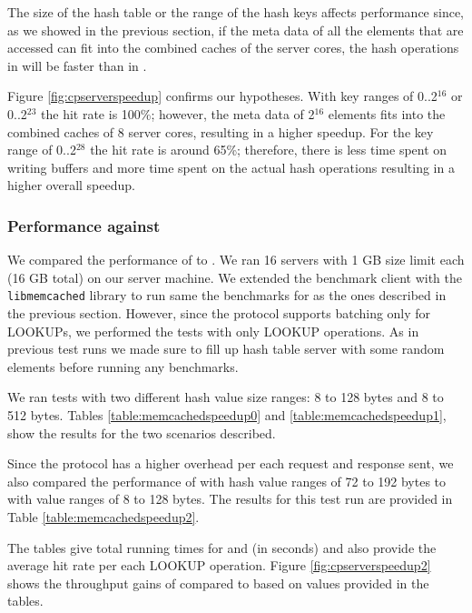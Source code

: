 The size of the hash table or the range of the hash keys affects performance since, as we showed in the previous section, if the meta data of all the elements 
that are accessed can fit into the combined caches of the server cores, the hash operations in \cphash{} will be faster than in \lockhash{}.

Figure \ref{fig:cpserverspeedup} confirms our hypotheses. With key ranges of 0..2$^{16}$ or 0..2$^{23}$ the hit rate is 100\%; however, the meta data of 
2$^{16}$ elements fits into the combined caches of 8 server cores, resulting in a higher speedup. For the key range of 0..2$^{28}$ the hit rate is around 65\%; 
therefore, there is less time spent on writing buffers and more time spent on the actual hash operations resulting in a higher overall speedup.

\subsubsection{Performance against \memcached{}}
We compared the performance of \cpserver{} to \memcached{}. We ran 16 \memcached{} servers with 1 GB size limit each (16 GB total) on our server machine.
We extended the benchmark client with the \texttt{libmemcached} library \cite{libmemcached} to run same the benchmarks for \memcached{} as the ones described in
the previous section. However, since the \memcached{} protocol supports batching only for LOOKUPs, we performed the tests with only LOOKUP operations. As in previous 
test runs we made sure to fill up hash table server with some random elements before running any benchmarks. 

We ran tests with two different hash value size ranges: 8 to 128 bytes and 8 to 512 bytes. 
Tables \ref{table:memcachedspeedup0} and \ref{table:memcachedspeedup1}, show the results for the two scenarios described.

Since the \memcached{} protocol has a higher overhead per each request and response sent, we also compared the performance of \cpserver{} with hash value 
ranges of 72 to 192 bytes to \memcached{} with value ranges of 8 to 128 bytes. The results for this test run are provided in Table \ref{table:memcachedspeedup2}.

The tables give total running times for \cpserver{} and \memcached{} (in seconds) and also provide the average hit rate per each LOOKUP operation.
Figure \ref{fig:cpserverspeedup2} shows the throughput gains of \cpserver{} compared to \memcached{} based on values provided in the tables. 

